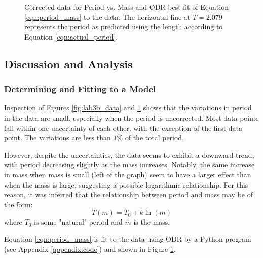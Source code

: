 \documentclass[aps,twocolumn,secnumarabic,nobalancelastpage,amsmath,amssymb,nofootinbib,floatfix,letterpaper]{revtex4}
\begin{document}
\begin{figure}[htbp]
    \caption{Corrected data for Period vs. Mass and ODR best fit of Equation \ref{eqn:period_mass} to the data.
        The horizontal line at \(T = 2.079\) represents the period as predicted using the length according to Equation \ref{eqn:actual_period}.}
    \label{fig:lab3b_data_corrected}
\end{figure}

\subsection{Discussion and Analysis}
\label{sec:lab3b_analysis}

\subsubsection{Determining and Fitting to a Model}

Inspection of Figures \ref{fig:lab3b_data} and \ref{fig:lab3b_data_corrected} shows that the variations in period in the
data are small, especially when the period is uncorrected. Most data points fall within one uncertainty of each
other, with the exception of the first data point. The variations are less than \(1\%\) of the total period.

However, despite the uncertainties, the data seems to exhibit a downward trend, with period decreasing slightly as the
mass increases. Notably, the same increase in mass when mass is small (left of the graph) seem to have a larger effect
than when the mass is large, suggesting a possible logarithmic relationship. For this reason, it was inferred that the
relationship between period and mass may be of the form:
\begin{equation}
    T(m) = T_0 + k\ln(m)
    \label{eqn:period_mass}
\end{equation}
where \(T_0\) is some "natural" period and \(m\) is the mass.

Equation \ref{eqn:period_mass} is fit to the data using ODR by a Python program (see Appendix \ref{appendix:code}) and
shown in Figure \ref{fig:lab3b_data_corrected}.
\end{document}
